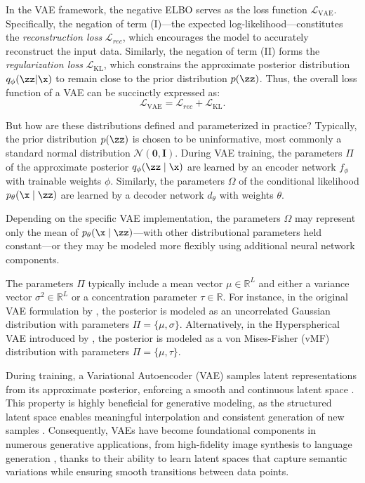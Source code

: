 In the VAE framework, the negative ELBO serves as the loss function $\mathcal{L}_{\text{VAE}}$. Specifically, the negation of term (I)—the expected log-likelihood—constitutes the \textit{reconstruction loss} $\mathcal{L}_{rec}$, which encourages the model to accurately reconstruct the input data. Similarly, the negation of term (II) forms the \textit{regularization loss} $\mathcal{L}_{\text{KL}}$, which constrains the approximate posterior distribution $q_{\phi}(\zz|\x)$ to remain close to the prior distribution $p(\zz)$. Thus, the overall loss function of a VAE can be succinctly expressed as:
\[
  \mathcal{L}_{\text{VAE}} = \mathcal{L}_{rec} + \mathcal{L}_{\text{KL}}.
\]

But how are these distributions defined and parameterized in practice? Typically, the prior distribution $p(\zz)$ is chosen to be uninformative, most commonly a standard normal distribution $\mathcal{N}(\mathbf{0},\mathbf{I})$. During VAE training, the parameters $\Pi$ of the approximate posterior $q_{\phi}(\zz \mid \x)$ are learned by an encoder network $f_{\phi}$ with trainable weights $\phi$. Similarly, the parameters $\Omega$ of the conditional likelihood $p_{\theta}(\x \mid \zz)$ are learned by a decoder network $d_{\theta}$ with weights $\theta$.

Depending on the specific VAE implementation, the parameters $\Omega$ may represent only the mean of $p_{\theta}(\x \mid \zz)$—with other distributional parameters held constant—or they may be modeled more flexibly using additional neural network components.

The parameters $\Pi$ typically include a mean vector $\mu \in \mathbb{R}^L$ and either a variance vector $\sigma^2 \in \mathbb{R}^L$ or a concentration parameter $\tau \in \mathbb{R}$. For instance, in the original VAE formulation by \cite{kingma2013auto}, the posterior is modeled as an uncorrelated Gaussian distribution with parameters $\Pi = \{\mu,\sigma\}$. Alternatively, in the Hyperspherical VAE introduced by \cite{Davidson2018-dq}, the posterior is modeled as a von Mises-Fisher (vMF) distribution with parameters $\Pi = \{\mu,\tau\}$.

During training, a Variational Autoencoder (VAE) samples latent representations from its approximate posterior, enforcing a smooth and continuous latent space \cite{Valleti2024InvariantVAE}. This property is highly beneficial for generative modeling, as the structured latent space enables meaningful interpolation and consistent generation of new samples \cite{Vahdat2021LSGM}. Consequently, VAEs have become foundational components in numerous generative applications, from high-fidelity image synthesis \cite{Vahdat2020NVAE,Rombach2022LDM} to language generation \cite{Li2020Optimus}, thanks to their ability to learn latent spaces that capture semantic variations while ensuring smooth transitions between data points.

